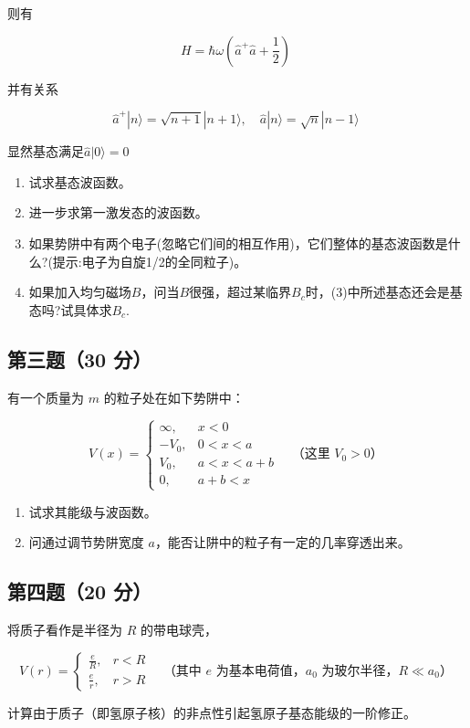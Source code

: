 则有

\[
H = \hbar \omega \left( \hat{a}^+ \hat{a} + \frac{1}{2} \right)~
\]

并有关系

\[
\hat{a}^+ |n\rangle = \sqrt{n+1} |n+1\rangle, \quad
\hat{a} |n\rangle = \sqrt{n} |n-1\rangle~
\]

显然基态满足$\hat{a} |0\rangle = 0$

\begin{enumerate}
    \item 试求基态波函数。
    \item 进一步求第一激发态的波函数。
    \item 如果势阱中有两个电子(忽略它们间的相互作用)，它们整体的基态波函数是什么?(提示:电子为自旋1/2的全同粒子)。
    \item 如果加入均匀磁场$B$，问当$B$很强，超过某临界$B_c$时，(3)中所述基态还会是基态吗?试具体求$B_c$.
\end{enumerate}
\subsection{第三题（30 分）}
有一个质量为 $m$ 的粒子处在如下势阱中：

\[
V(x) =
\begin{cases}
\infty, & x < 0 \\
-V_0, & 0 < x < a \\
V_0, & a < x < a + b \\
0, & a + b < x 
\end{cases}
\quad \text{（这里 } V_0 > 0\text{）}~
\]

\begin{enumerate}
    \item 试求其能级与波函数。
    \item 问通过调节势阱宽度 $a$，能否让阱中的粒子有一定的几率穿透出来。
\end{enumerate}
\subsection{第四题（20 分）}
将质子看作是半径为 $R$ 的带电球壳，

\[
V(r) =
\begin{cases}
\frac{e}{R}, & r < R \\
\frac{e}{r}, & r > R 
\end{cases}
\quad \text{（其中 } e \text{ 为基本电荷值，} a_0 \text{ 为玻尔半径，} R \ll a_0\text{）}~
\]

计算由于质子（即氢原子核）的非点性引起氢原子基态能级的一阶修正。